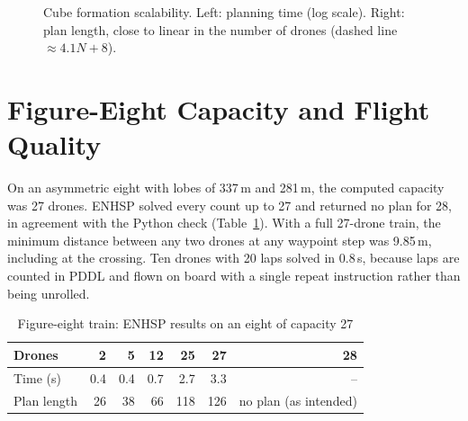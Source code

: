 \documentclass[11pt,a4paper,oneside]{report}
\begin{document}
\begin{figure}[H]
\centering
{}\hfill
{}
\caption[Cube formation scalability]{Cube formation scalability. Left: planning time (log scale).
Right: plan length, close to linear in the number of drones (dashed line $\approx 4.1N + 8$).}
\label{fig:cubeplot}
\end{figure}

\section{Figure-Eight Capacity and Flight Quality}
On an asymmetric eight with lobes of 337\,m and 281\,m, the computed capacity was 27 drones. ENHSP
solved every count up to 27 and returned no plan for 28, in agreement with the Python check
(Table~\ref{tab:fig8}). With a full 27-drone train, the minimum distance between any two drones at
any waypoint step was 9.85\,m, including at the crossing. Ten drones with 20 laps solved in 0.8\,s,
because laps are counted in PDDL and flown on board with a single repeat instruction rather than
being unrolled.

\begin{table}[H]
\caption{Figure-eight train: ENHSP results on an eight of capacity 27}\label{tab:fig8}
\small
\begin{tabular*}{\textwidth}{@{\extracolsep{\fill}}lrrrrrr@{}}
\toprule
\textbf{Drones} & 2 & 5 & 12 & 25 & 27 & 28 \\
\midrule
Time (s) & 0.4 & 0.4 & 0.7 & 2.7 & 3.3 & -- \\
Plan length & 26 & 38 & 66 & 118 & 126 & no plan (as intended) \\
\bottomrule
\end{tabular*}
\end{table}
\end{document}
